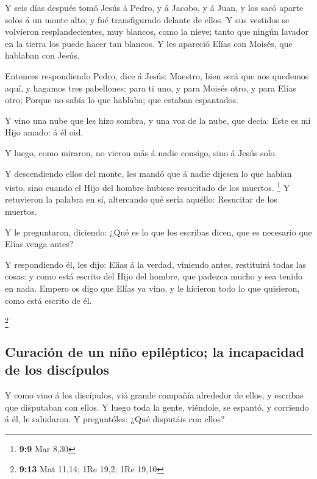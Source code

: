  Y seis días después tomó Jesús á Pedro, y á Jacobo, y á
Juan, y los sacó aparte solos á un monte alto; y fué transfigurado
delante de ellos.  Y sus vestidos se volvieron
resplandecientes, muy blancos, como la nieve; tanto que ningún lavador
en la tierra los puede hacer tan blancos.  Y les apareció
Elías con Moisés, que hablaban con Jesús.

 Entonces respondiendo Pedro, dice á Jesús: Maestro, bien
será que nos quedemos aquí, y hagamos tres pabellones: para ti uno, y
para Moisés otro, y para Elías otro;  Porque no sabía lo
que hablaba; que estaban espantados.

 Y vino una nube que les hizo sombra, y una voz de la
nube, que decía: Este es mi Hijo amado: á él oid.

 Y luego, como miraron, no vieron más á nadie consigo,
sino á Jesús solo.

 Y descendiendo ellos del monte, les mandó que á nadie
dijesen lo que habían visto, sino cuando el Hijo del hombre hubiese
resucitado de los muertos. \footnote{\textbf{9:9} Mar 8,30}
 Y retuvieron la palabra en sí, altercando qué sería
aquéllo: Resucitar de los muertos.

 Y le preguntaron, diciendo: ¿Qué es lo que los escribas
dicen, que es necesario que Elías venga antes?

 Y respondiendo él, les dijo: Elías á la verdad, viniendo
antes, restituirá todas las cosas: y como está escrito del Hijo del
hombre, que padezca mucho y sea tenido en nada.  Empero
os digo que Elías ya vino, y le hicieron todo lo que quisieron, como
está escrito de él.

\footnote{\textbf{9:13} Mat 11,14; 1Re 19,2; 1Re 19,10}

\hypertarget{curaciuxf3n-de-un-niuxf1o-epiluxe9ptico-la-incapacidad-de-los-discuxedpulos}{%
\subsection{Curación de un niño epiléptico; la incapacidad de los
discípulos}\label{curaciuxf3n-de-un-niuxf1o-epiluxe9ptico-la-incapacidad-de-los-discuxedpulos}}

 Y como vino á los discípulos, vió grande compañía
alrededor de ellos, y escribas que disputaban con ellos. 
Y luego toda la gente, viéndole, se espantó, y corriendo á él, le
saludaron.  Y preguntóles: ¿Qué disputáis con ellos?

